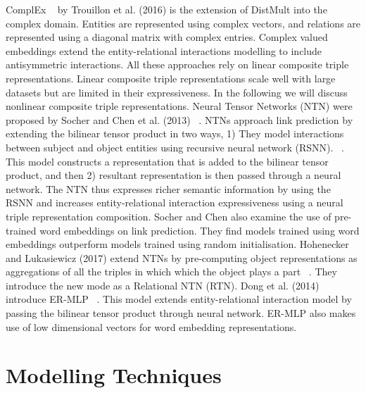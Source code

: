 ComplEx ~\citep{trouillon2016complex} by Trouillon et al. (2016) is the extension of DistMult into the complex domain. Entities are represented using complex vectors, and relations are represented using a diagonal matrix with complex entries. Complex valued embeddings extend the entity-relational interactions modelling to include antisymmetric interactions. \newline
All these approaches rely on linear composite triple representations. Linear composite triple representations scale well with large datasets but are limited in their expressiveness. In the following we will discuss nonlinear composite triple representations. \newline
Neural Tensor Networks (NTN) were proposed by Socher and Chen et al. (2013) ~\citep{NIPS2013_5028}. NTNs approach link prediction by extending the bilinear tensor product in two ways, 1) They model interactions between subject and object entities using recursive neural network (RSNN). ~\citep{socher2012semantic}. This model constructs a representation that is added to the bilinear tensor product, and then 2) resultant representation is then passed through a neural network. The NTN thus expresses richer semantic information by using the RSNN and increases entity-relational interaction expressiveness using a neural triple representation composition. Socher and Chen also examine the use of pre-trained word embeddings on link prediction. They find models trained using word embeddings outperform models trained using random initialisation. \newline
Hohenecker and Lukasiewicz (2017) extend NTNs by pre-computing object representations as aggregations of all the triples in which which the object plays a part ~\citep{hohenecker2017deep}. They introduce the new mode as a Relational NTN (RTN). \newline
Dong et al. (2014) introduce ER-MLP ~\citep{dong2014knowledge, nickel2015review}. This model extends entity-relational interaction model by passing the bilinear tensor product through neural network. ER-MLP also makes use of low dimensional vectors for word embedding representations. \newline 




\section{Modelling Techniques} %

